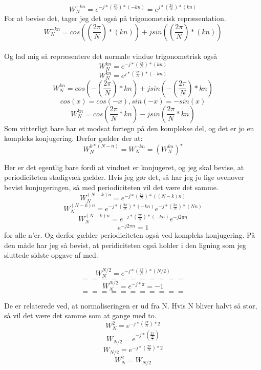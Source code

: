 \begin{Opgaver}
\begin{kapitel}
\begin{Opgave}
\begin{UnderOpgave}
                \[W_N^{-kn} = e^{-j * (\frac{2\pi}{N}) * (-kn)} = e^{j * (\frac{2\pi}{N}) * (kn)}\]
                For at bevise det, tager jeg det også på trigonometrisk repræsentation.
                \[W_N^{-kn} = cos((\frac{2\pi}{N}) * (kn)) + jsin((\frac{2\pi}{N}) * (kn))\]\\
                Og lad mig så repræsentere det normale vindue trigonometrisk også 
                \[W_N^{kn} = e^{-j * (\frac{2\pi}{N}) * (kn)}\]
                \[W_N^{kn} = e^{j * (\frac{2\pi}{N}) * (-kn)}\]
                \[W_N^{kn} = cos(-(\frac{2\pi}{N}) * kn) + jsin(-(\frac{2\pi}{N}) * kn) \]
                \[cos(x) = cos(-x), sin(-x) = -sin(x)\]
                \[W_N^{kn} = cos(\frac{2\pi}{N} * kn) - jsin(\frac{2\pi}{N} * kn)\]
                Som vitterligt bare har et modsat fortegn på den komplekse del, og det er jo en kompleks konjugering. Derfor gælder der at: 
                \[W_N^{k*(N - n)} = W_N^{-kn} = (W_N^{kn})^\star\]
            \end{UnderOpgave}

            \begin{UnderOpgave}
                Her er det egentlig bare fordi at vinduet er konjugeret, og jeg skal bevise, at periodiciteten stadigvæk gælder. 
                Hvis jeg gør det, så har jeg jo lige ovenover bevist konjugeringen, så med periodiciteten vil det være det samme. 
                \[W_N^{(N - k)n} = e^{-j * (\frac{2\pi}{N}) * ((N - k)n)}\]
                \[W_N^{(N - k)n} = e^{-j * (\frac{2\pi}{N}) * (-kn)}e^{-j * (\frac{2\pi}{N}) * (Nn)}\]
                \[W_N^{(N - k)n} = e^{-j * (\frac{2\pi}{N}) * (-kn)}e^{-j 2\pi n}\]
                \[e^{-j 2\pi n} = 1\] 
                for alle n'er. Og derfor gælder periodiciteten også ved kompleks konjugering. 
                På den måde har jeg så bevist, at peridiciteten også holder i den ligning som jeg sluttede sidste opgave af med. 
            \end{UnderOpgave}

            \begin{UnderOpgave}
                \[W_N^{N/2} = e^{-j * (\frac{2\pi}{N}) * (N/2)}\]
                \[===========\]
                \[W_N^{N/2} = e^{-j * \pi} = -1\]
                \[===========\]
            \end{UnderOpgave}

            \begin{UnderOpgave}
                De er relaterede ved, at normaliseringen er ud fra N. Hvis N bliver halvt så stor, så vil det være det samme som at gange med to.
                \[W_N^{2} = e^{-j * (\frac{2\pi}{N}) * 2}\]
                \[W_{N/2} = e^{-j * (\frac{2\pi}{\frac{N}{2}})} \]
                \[W_{N/2} = e^{-j * (\frac{2\pi}{N}) * 2 }\]
                \[W_N^{2} = W_{N/2}\]
                

\end{UnderOpgave}
\end{Opgave}
\end{kapitel}
\end{Opgaver}
